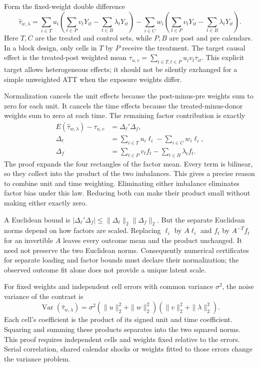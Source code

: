 Form the fixed-weight double difference
\begin{equation}
 \widehat\tau_{w,\lambda}
 =\sum_{i\in T}u_i\left(\sum_{t\in P}v_tY_{it}
                         -\sum_{t\in B}\lambda_tY_{it}\right)
 -\sum_{i\in C}w_i\left(\sum_{t\in P}v_tY_{it}
                         -\sum_{t\in B}\lambda_tY_{it}\right).
 \label{exec17:s6-double-difference}
\end{equation}
Here $T,C$ are the treated and control sets, while $P,B$ are post and
pre calendars. In a block design, only cells in $T$ by $P$ receive the
treatment. The target causal effect is the treated-post weighted mean
$\tau_{u,v}=\sum_{i\in T,t\in P}u_iv_t\tau_{it}$. This explicit target
allows heterogeneous effects; it should not be silently exchanged for a
simple unweighted ATT when the exposure weights differ.

Normalization cancels the unit effects because the post-minus-pre weights
sum to zero for each unit. It cancels the time effects because the
treated-minus-donor weights sum to zero at each time. The remaining
factor contribution is exactly
\begin{align}
 E(\widehat\tau_{w,\lambda})-\tau_{u,v}
 &=\Delta_\ell'\Delta_f,\label{exec17:s6-imbalance-product}\\
 \Delta_\ell&=\sum_{i\in T}u_i\ell_i-\sum_{i\in C}w_i\ell_i,\nonumber\\
 \Delta_f&=\sum_{t\in P}v_tf_t-\sum_{t\in B}\lambda_tf_t.\nonumber
\end{align}
The proof expands the four rectangles of the factor mean. Every term is
bilinear, so they collect into the product of the two imbalances.
This gives a precise reason to combine unit and time weighting. Eliminating
either imbalance eliminates factor bias under this law. Reducing both can
make their product small without making either exactly zero.

A Euclidean bound is
$|\Delta_\ell'\Delta_f|\leq\|\Delta_\ell\|_2\|\Delta_f\|_2$.
But the separate Euclidean norms depend on how factors are scaled. Replacing
$\ell_i$ by $A\ell_i$ and $f_t$ by $A^{-T}f_t$ for an invertible $A$
leaves every outcome mean and the product unchanged. It need not preserve
the two Euclidean norms. Consequently numerical certificates for separate
loading and factor bounds must declare their normalization; the observed
outcome fit alone does not provide a unique latent scale.

For fixed weights and independent cell errors with common variance
$\sigma^2$, the noise variance of the contrast is
\begin{equation}
 \operatorname{Var}(\widehat\tau_{w,\lambda})
 =\sigma^2(\|u\|_2^2+\|w\|_2^2)
             (\|v\|_2^2+\|\lambda\|_2^2).
 \label{exec17:s6-sdid-noise}
\end{equation}
Each cell's coefficient is the product of its signed unit and time
coefficient. Squaring and summing these products separates into the two
squared norms. This proof requires independent cells and weights fixed
relative to the errors. Serial correlation, shared calendar shocks or
weights fitted to those errors change the variance problem.

